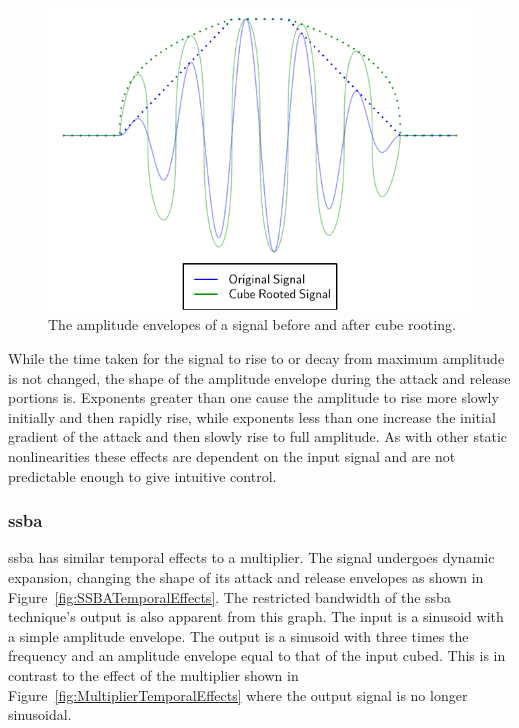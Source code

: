 			\begin{figure}[h!]
				\centering
				\includegraphics{chapter5/Images/ExponentiationTemporalEffects.pdf}
				\caption{The amplitude envelopes of a signal before and after cube rooting.}
				\label{fig:ExponentiationTemporalEffects}
			\end{figure}

			While the time taken for the signal to rise to or decay from maximum amplitude is not changed, the
			shape of the amplitude envelope during the attack and release portions is. Exponents greater than
			one cause the amplitude to rise more slowly initially and then rapidly rise, while exponents less
			than one increase the initial gradient of the attack and then slowly rise to full amplitude. As
			with other static nonlinearities these effects are dependent on the input signal and are not
			predictable enough to give intuitive control.

		\subsubsection*{\acrshort{ssba}}
			\acrshort{ssba} has similar temporal effects to a multiplier. The signal undergoes dynamic
			expansion, changing the shape of its attack and release envelopes as shown in
			Figure~\ref{fig:SSBATemporalEffects}.  The restricted bandwidth of the \acrshort{ssba} technique's
			output is also apparent from this graph. The input is a sinusoid with a simple amplitude envelope.
			The output is a sinusoid with three times the frequency and an amplitude envelope equal to that of
			the input cubed. This is in contrast to the effect of the multiplier shown in
			Figure~\ref{fig:MultiplierTemporalEffects} where the output signal is no longer sinusoidal.

